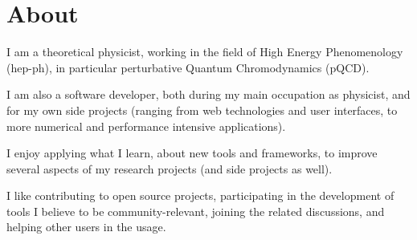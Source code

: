 \section{About}
I am a theoretical physicist, working in the field of High Energy Phenomenology
(hep-ph), in particular perturbative Quantum Chromodynamics (pQCD).\newline

I am also a software developer, both during my main occupation as physicist,
and for my own side projects (ranging from web technologies and user
interfaces, to more numerical and performance intensive applications).

I enjoy applying what I learn, about new tools and frameworks, to improve
several aspects of my research projects (and side projects as well).\newline

I like contributing to open source projects, participating in the development
of tools I believe to be community-relevant, joining the related discussions,
and helping other users in the usage.

